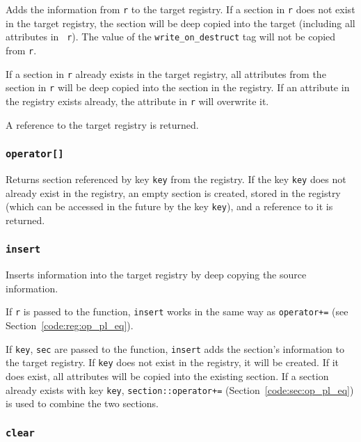 
Adds the information from {\tt r} to the target registry.  If a
section in {\tt r} does not exist in the target registry, the section
will be deep copied into the target (including all attributes in {\tt
r}).  The value of the {\tt write\_on\_destruct} tag will not be
copied from {\tt r}.

If a section in {\tt r} already exists in the target registry, all
attributes from the section in {\tt r} will be deep copied into the
section in the registry.  If an attribute in the registry exists
already, the attribute in {\tt r} will overwrite it.

A reference to the target registry is returned.


\subsubsection{{\tt operator[]}}


Returns section referenced by key {\tt key} from the registry.  If the key
{\tt key} does not already exist in the registry, an empty section is
created, stored in the registry (which can be accessed in the future
by the key {\tt key}), and a reference to it is returned.


\subsubsection[insert]{{\tt insert}}


Inserts information into the target registry by deep copying the
source information.

If {\tt r} is passed to the function, {\tt insert} works in the same
way as {\tt operator+=} (see Section~\ref{code:reg:op_pl_eq}).

If {\tt key}, {\tt sec} are passed to the function, {\tt insert} adds
the section's information to the target registry.  If {\tt key} does
not exist in the registry, it will be created.  If it does exist, all
attributes will be copied into the existing section.  If a section
already exists with key {\tt key}, {\tt section::operator+=}
(Section~\ref{code:sec:op_pl_eq}) is used to combine the two sections.


\subsubsection[clear]{{\tt clear}}

